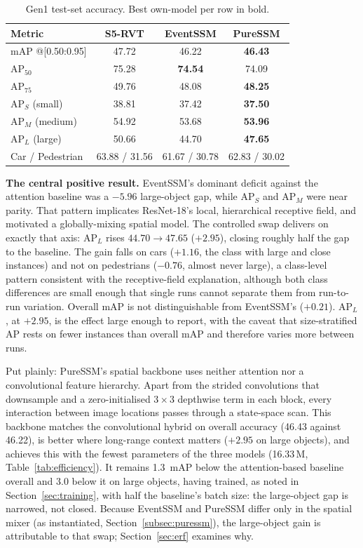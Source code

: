 \documentclass[11pt, a4paper]{report}
\begin{document}
\begin{table}[htbp]
\centering
\caption{Gen1 test-set accuracy. Best own-model per row in bold.}
\label{tab:accuracy}
\begin{tabular}{lccc}
\toprule
\textbf{Metric} & \textbf{S5-RVT} & \textbf{EventSSM} & \textbf{PureSSM} \\
\midrule
mAP @[0.50:0.95]        & 47.72 & 46.22 & \textbf{46.43} \\
$\mathrm{AP}_{50}$      & 75.28 & \textbf{74.54} & 74.09 \\
$\mathrm{AP}_{75}$      & 49.76 & 48.08 & \textbf{48.25} \\
$\mathrm{AP}_S$ (small) & 38.81 & 37.42 & \textbf{37.50} \\
$\mathrm{AP}_M$ (medium)& 54.92 & 53.68 & \textbf{53.96} \\
$\mathrm{AP}_L$ (large) & 50.66 & 44.70 & \textbf{47.65} \\
\midrule
Car / Pedestrian        & 63.88 / 31.56 & 61.67 / 30.78 & 62.83 / 30.02 \\
\bottomrule
\end{tabular}
\end{table}

\textbf{The central positive result.} EventSSM's dominant deficit against the attention baseline was a
$-5.96$ large-object gap, while $\mathrm{AP}_S$ and $\mathrm{AP}_M$ were near parity. That pattern
implicates ResNet-18's local, hierarchical receptive field, and motivated a globally-mixing spatial
model. The controlled swap delivers on exactly that axis: $\mathrm{AP}_L$ rises
$44.70 \rightarrow 47.65$ ($+2.95$), closing roughly half the gap to the baseline. The gain
falls on cars ($+1.16$, the class with large and close instances) and not on pedestrians ($-0.76$,
almost never large), a class-level pattern consistent with the receptive-field explanation, although
both class differences are small enough that single runs cannot separate them from run-to-run variation.
Overall mAP is not distinguishable from EventSSM's ($+0.21$). $\mathrm{AP}_L$, at $+2.95$, is the effect
large enough to report, with the caveat that size-stratified AP rests on fewer instances than overall mAP
and therefore varies more between runs.

Put plainly: PureSSM's spatial backbone uses neither attention nor a convolutional feature hierarchy.
Apart from the strided convolutions that downsample and a zero-initialised $3\times3$ depthwise term in
each block, every interaction between image locations passes through a state-space scan. This backbone
matches the convolutional hybrid on overall accuracy (46.43 against 46.22), is better where long-range
context matters ($+2.95$ on large objects), and achieves this with the fewest parameters of the three
models (16.33\,M, Table~\ref{tab:efficiency}). It remains 1.3~mAP below the attention-based baseline
overall and 3.0 below it on large objects, having trained, as noted in Section~\ref{sec:training}, with
half the baseline's batch size: the large-object gap is narrowed, not closed. Because EventSSM and
PureSSM differ only in the spatial mixer (as instantiated, Section~\ref{subsec:puressm}), the
large-object gain is attributable to that swap;
Section~\ref{sec:erf} examines why.
\end{document}

